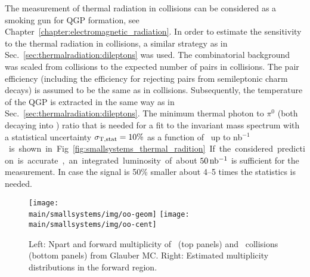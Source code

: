 \documentclass[../report.tex]{subfiles}
\providecommand{\main}{..}
\begin{document}
The measurement of thermal radiation in \pPb collisions can be considered as a smoking gun for QGP formation, see Chapter~\ref{chapter:electromagnetic_radiation}. In order to estimate the sensitivity to the thermal radiation in \pPb collisions, a similar strategy as in Sec.~\ref{sec:thermalradiation:dileptons} was used.
The combinatorial background was scaled from \PbPb collisions to the expected number of pairs in \pPb collisions. The pair efficiency (including the efficiency for rejecting \Pepem pairs from semileptonic charm decays) is assumed to be the same as in \PbPb collisions.
Subsequently, the temperature of the QGP is extracted in the same way as in Sec.~\ref{sec:thermalradiation:dileptons}. The minimum thermal photon to $\pi^{0}$ (both decaying into \Pepem) ratio that is needed for a fit to the invariant mass spectrum with a statistical uncertainty $\sigma_{\rm T,stat} = 10\%$ as a function of \Lint\ up to \unit[2000]{nb$^{-1}$} is shown in Fig.~\ref{fig:smallsystems_thermal_radition}. If the considered prediction is accurate, an integrated luminosity of about $\unit[50]{nb^{-1}}$ is sufficient for the measurement. In case the signal is 50\% smaller about 4--5 times the statistics is needed.

\begin{figure}[t]
\centering
\texttt{[image: \\main/smallsystems/img/oo-geom]}
\hspace{0.5cm}
\texttt{[image: \\main/smallsystems/img/oo-cent]}
\caption{Left: Npart and forward multiplicity of \OO\ (top panels) and \pPb\ collisions (bottom panels) from Glauber MC. Right: Estimated multiplicity distributions in the forward region.}
\label{fig:oopot}
\end{figure}
\end{document}
